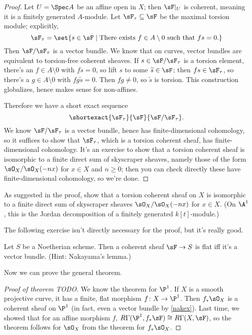 \begin{proof}
Let $U = \Spec A$ be an affine open in $X$; then $\sF|_U$ is coherent, meaning it is a finitely generated $A$-module. Let $\sF_\tau\subseteq\sF$ be the maximal torsion module; explicitly,
\begin{equation}
    \sF_\tau = \set{s\in\sF\mid \text{There exists } f\in A\setminus 0\text{ such that } fs = 0.}
\end{equation}
Then $\sF/\sF_\tau$ is a vector bundle. We know that on curves, vector bundles are equivalent to torsion-free coherent sheaves. If $s\in\sF/\sF_\tau$ is a torsion element, there's an $f\in A\setminus 0$ with $fs = 0$, so lift $s$ to some $\widetilde s\in\sF$; then $fs\in\sF_\tau$, so there's a $g\in A\setminus 0$ with $fg\widetilde s = 0$. Then $fg\ne 0$, so $\widetilde s$ is torsion. This construction globalizes, hence makes sense for non-affines.

Therefore we have a short exact sequence
\begin{equation}
\shortexact{\sF_\tau}{\sF}{\sF/\sF_\tau}.
\end{equation}
We know $\sF/\sF_\tau$ is a vector bundle, hence has finite-dimensional cohomology, so it suffices to show that $\sF_\tau$, which is a torsion coherent sheaf, has finite-dimensional cohomology. It's an exercise to show that a torsion coherent sheaf is isomorphic to a finite direct sum of skyscraper sheaves, namely those of the form $\sO_X/\sO_X(-nx)$ for $x\in X$ and $n\ge 0$; then you can check directly these have finite-dimensional cohomology, so we're done.
\end{proof}
\begin{ex}
As suggested in the proof, show that a torsion coherent sheaf on $X$ is isomorphic to a finite direct sum of skyscraper sheaves $\sO_X/\sO_X(-nx)$ for $x\in X$. (On $\A^1$, this is the Jordan decomposition of a finitely generated $k[t]$-module.)
\end{ex}
The following exercise isn't directly necessary for the proof, but it's really good.
\begin{ex}
Let $S$ be a Noetherian scheme. Then a coherent sheaf $\sF\to S$ is flat iff it's a vector bundle. (Hint: Nakayama's lemma.)
\end{ex}
Now we can prove the general theorem.
\begin{proof}[Proof of theorem TODO]
We know the theorem for $\P^1$. If $X$ is a smooth projective curve, it has a finite, flat morphism $f\colon X\to\P^1$. Then $f_*\sO_X$ is a coherent sheaf on $\P^1$ (in fact, even a vector bundle by \cref{nakex}). Last time, we showed that for an affine morphism $f$, $R\Gamma(\P^1, f_*\sF)\cong R\Gamma(X,\sF)$, so the theorem follows for $\sO_X$ from the theorem for $f_*\sO_X$.
\end{proof}
